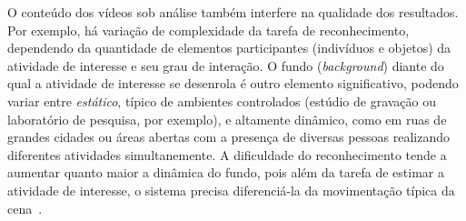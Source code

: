 %
O conteúdo dos vídeos sob análise também interfere na qualidade dos resultados. Por exemplo, há variação de complexidade da tarefa de reconhecimento, dependendo da quantidade de elementos participantes (indivíduos e objetos) da atividade de interesse e seu grau de interação.%
O fundo (\emph{background}) diante do qual a atividade de interesse se desenrola é outro elemento significativo, podendo variar entre \emph{estático}, típico de ambientes controlados (estúdio de gravação ou laboratório de pesquisa, por exemplo), e altamente dinâmico, como em ruas de grandes cidades ou áreas abertas com a presença de diversas pessoas realizando diferentes atividades simultanemente. A dificuldade do reconhecimento tende a aumentar quanto maior a dinâmica do fundo, pois além da tarefa de estimar a atividade de interesse, o sistema precisa diferenciá-la da movimentação típica da cena~\parencite{jegham-2020}.
%

